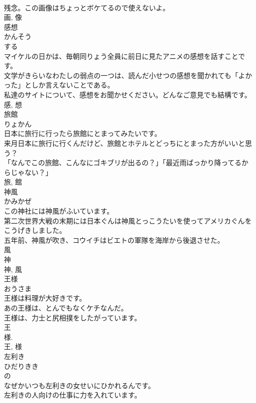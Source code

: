 \documentclass[8pt]{extreport}
\begin{document}
\begin{CJK}{UTF8}{min}
\\	残念。この画像はちょっとボケてるので使えないよ。	
\\	画, 像	
\\	感想	
\\	かんそう	
\\	する 
\\	マイケルの日かは、毎朝同りょう全員に前日に見たアニメの感想を話すことです。	
\\	文学がきらいなわたしの弱点の一つは、読んだ小せつの感想を聞かれても「よかった」としか言えないことである。	
\\	私達のサイトについて、感想をお聞かせください。どんなご意見でも結構です。	
\\	感, 想	
\\	旅館	
\\	りょかん	
\\	日本に旅行に行ったら旅館にとまってみたいです。	
\\	来月日本に旅行に行くんだけど、旅館とホテルとどっちにとまった方がいいと思う？	
\\	「なんでこの旅館、こんなにゴキブリが出るの？」「最近雨ばっかり降ってるからじゃない？」	
\\	旅, 館	
\\	神風	
\\	かみかぜ	
\\	この神社には神風がふいています。	
\\	第二次世界大戦の末期には日本ぐんは神風とっこうたいを使ってアメリカぐんをこうげきしました。	
\\	五年前、神風が吹き、コウイチはビエトの軍隊を海岸から後退させた。	
\\	風 
\\	神 
\\	神, 風	
\\	王様	
\\	おうさま	
\\	王様は料理が大好きです。	
\\	あの王様は、とんでもなくケチなんだ。	
\\	王様は、力士と尻相撲をしたがっています。	
\\	王 
\\	様. 
\\	王, 様	
\\	左利き	
\\	ひだりきき	
\\	の 
\\	なぜかいつも左利きの女せいにひかれるんです。	
\\	左利きの人向けの仕事に力を入れています。	

\end{CJK}
\end{document}
